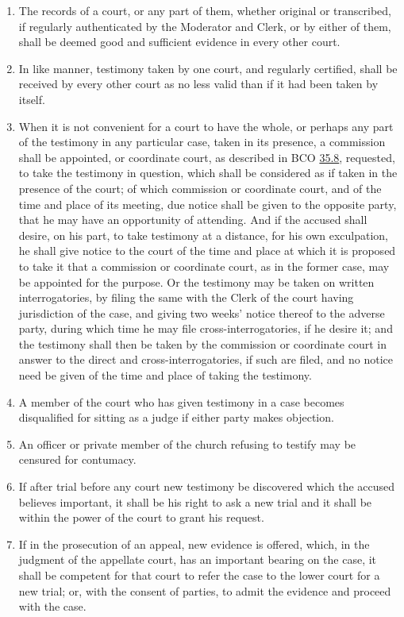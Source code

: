\documentclass[
]{book}
\begin{document}
\begin{enumerate}
\item
  The records of a court, or any part of them, whether original or transcribed, if regularly authenticated by the Moderator and Clerk, or by either of them, shall be deemed good and sufficient evidence in every other court.
\item
  In like manner, testimony taken by one court, and regularly certified, shall be received by every other court as no less valid than if it had been taken by itself.
\item
  When it is not convenient for a court to have the whole, or perhaps any part of the testimony in any particular case, taken in its presence, a commission shall be appointed, or coordinate court, as described in BCO \protect\hyperlink{35.8}{35.8}, requested, to take the testimony in question, which shall be considered as if taken in the presence of the court; of which commission or coordinate court, and of the time and place of its meeting, due notice shall be given to the opposite party, that he may have an opportunity of attending. And if the accused shall desire, on his part, to take testimony at a distance, for his own exculpation, he shall give notice to the court of the time and place at which it is proposed to take it that a commission or coordinate court, as in the former case, may be appointed for the purpose. Or the testimony may be taken on written interrogatories, by filing the same with the Clerk of the court having jurisdiction of the case, and giving two weeks' notice thereof to the adverse party, during which time he may file cross-interrogatories, if he desire it; and the testimony shall then be taken by the commission or coordinate court in answer to the direct and cross-interrogatories, if such are filed, and no notice need be given of the time and place of taking the testimony.
\item
  A member of the court who has given testimony in a case becomes disqualified for sitting as a judge if either party makes objection.
\item
  An officer or private member of the church refusing to testify may be censured for contumacy.
\item
  If after trial before any court new testimony be discovered which the accused believes important, it shall be his right to ask a new trial and it shall be within the power of the court to grant his request.
\item
  \protect\hypertarget{38.14}{\href{}{}}If in the prosecution of an appeal, new evidence is offered, which, in the judgment of the appellate court, has an important bearing on the case, it shall be competent for that court to refer the case to the lower court for a new trial; or, with the consent of parties, to admit the evidence and proceed with the case.
\end{enumerate}
\end{document}
